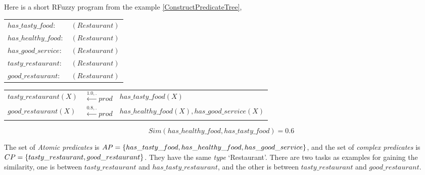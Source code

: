 \begin{ex}

Here is a short RFuzzy program from the example \ref{ConstructPredicateTree},
\begin{center}
\begin{tabular}{l l}
$has\_tasty\_food:$  & $(Restaurant)$\\

$has\_healthy\_food:$ &  $(Restaurant)$\\

$has\_good\_service:$  & $(Restaurant)$\\

$tasty\_restaurant:$  & $(Restaurant)$\\

$good\_restaurant:$  & $(Restaurant)$\\
\end{tabular}
\end{center}
\begin{tabular}{l l l}
$tasty\_restaurant(X)$ & $\stackrel{1.0,.}{\longleftarrow} prod$ & $has\_tasty\_food(X)$\\

$good\_restaurant(X)$ & $\stackrel{0.8,.}{\longleftarrow} prod$ & $has\_healthy\_food(X), has\_good\_service(X)$ \\

\end{tabular}
\[Sim(has\_healthy\_food, has\_tasty\_food) = 0.6\]

\end{ex}
The set of \textit{Atomic predicates} is $AP= \{has\_tasty\_food, has\_healthy\_food, \linebreak[4]has\_good\_service\}$, and the set of \textit{complex predicates} is $CP= \{tasty\_restaurant,  \linebreak[4]good\_restaurant\}$. They have the same \textit{type} `Restaurant'. There are two tasks as examples for gaining the similarity, one is between  $tasty\_restaurant$ and $has\_tasty\_restaurant$, and the other is between $tasty\_restaurant$ and $good\_restaurant$.

